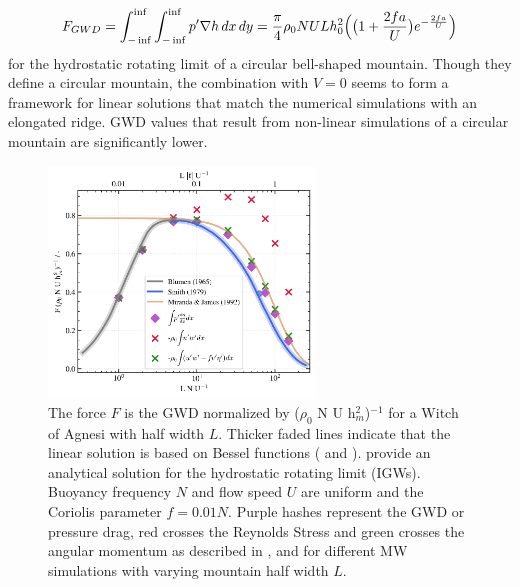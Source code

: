 \begin{equation}
    F_{GWD} = \int_{-\inf}^{\inf} \int_{-\inf}^{\inf} p' \nabla h \, dx \, dy = \frac{\pi}{4} \rho_0 N U L h_0^2 \Bigl( \bigl(1 + \frac{2fa}{U}\bigr) e^{-\frac{2fa}{U}} \Bigr)
    \label{equ:gwd-miranda}
\end{equation}
for the hydrostatic rotating limit of a circular bell-shaped mountain. Though they define a circular mountain, the combination with $V=0$ seems to form a framework for linear solutions that match the numerical simulations with an elongated ridge. GWD values that result from non-linear simulations of a circular mountain are significantly lower.
 \begin{figure}[t]
    \centering
    \includegraphics[width=0.63\textwidth]{figures_model/GWD-linearTheory-Q3D.png}
    \caption{The force $F$ is the GWD normalized by ($\rho_0$ N U h$_m^2$)$^{-1}$ for a Witch of Agnesi with half width $L$. Thicker faded lines indicate that the linear solution is based on Bessel functions (\cite[]{blumen_momentum_1965} and \cite[]{smith_influence_1979}). \textcite[]{miranda_non-linear_1992} provide an analytical solution for the hydrostatic rotating limit (IGWs). Buoyancy frequency $N$ and flow speed $U$ are uniform and the Coriolis parameter $f=0.01N$. Purple hashes represent the GWD or pressure drag, red crosses the Reynolds Stress and green crosses the angular momentum as described in \textcite[]{bretherton_momentum_1969}, \textcite[]{smith_influence_1979} and \textcite[]{broad_linear_1995} for different MW simulations with varying mountain half width $L$.}
    \label{fig:GWD-MWs}
\end{figure}

